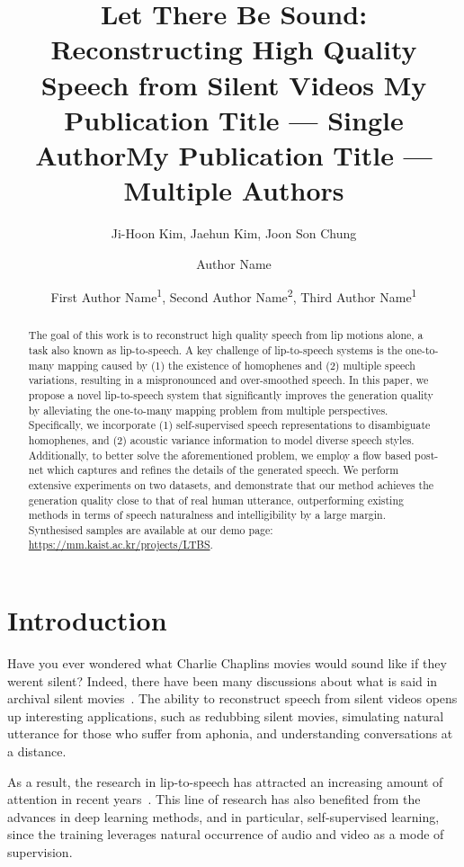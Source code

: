\documentclass[letterpaper]{article} %
\title{
Let There Be Sound: Reconstructing High Quality Speech from Silent Videos
}
\author{
    Ji-Hoon Kim\equalcontrib,
    Jaehun Kim\equalcontrib,
    Joon Son Chung
}
\title{My Publication Title --- Single Author}
\author {
    Author Name
}
\title{My Publication Title --- Multiple Authors}
\author {
    First Author Name\textsuperscript{\rm 1},
    Second Author Name\textsuperscript{\rm 2},
    Third Author Name\textsuperscript{\rm 1}
}
\begin{document}
\maketitle

\begin{abstract}
The goal of this work is to reconstruct high quality speech from lip motions alone, a task also known as lip-to-speech. A key challenge of lip-to-speech systems is the one-to-many mapping caused by (1) the existence of homophenes and (2) multiple speech variations, resulting in a mispronounced and over-smoothed speech. In this paper, we propose a novel lip-to-speech system that significantly improves the generation quality by alleviating the one-to-many mapping problem from multiple perspectives. Specifically, we incorporate (1) self-supervised speech representations to disambiguate homophenes, and (2) acoustic variance information to model diverse speech styles. Additionally, to better solve the aforementioned problem, we employ a flow based post-net which captures and refines the details of the generated speech. We perform extensive experiments on two datasets, and demonstrate that our method achieves the generation quality close to that of real human utterance, outperforming existing methods in terms of speech naturalness and intelligibility by a large margin. Synthesised samples are available at our demo page: \url{https://mm.kaist.ac.kr/projects/LTBS}.
\end{abstract}


\section{Introduction}
Have you ever wondered what Charlie Chaplins movies would sound like if they werent silent? Indeed, there have been many discussions about what is said in archival silent movies~\cite{smith1987when,midgley2006new}. The ability to reconstruct speech from silent videos opens up interesting applications, such as redubbing silent movies, simulating natural utterance for those who suffer from aphonia, and understanding conversations at a distance.

As a result, the research in lip-to-speech has attracted an increasing amount of attention in recent years~\cite{kumar2019lipper,mira2022svts,kim2023lip}. This line of research has also benefited from the advances in deep learning methods, and in particular, self-supervised learning, since the training leverages natural occurrence of audio and video as a mode of supervision.
\end{document}
